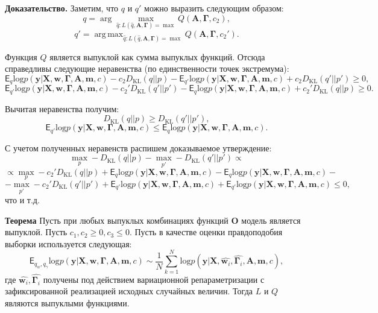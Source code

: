 \documentclass[12pt]{article}
\DeclareMathOperator*{\argmax}{arg\,max}
\begin{document}
\textbf{Доказательство.}
Заметим, что $q$ и $q'$ можно выразить следующим образом:
\[
    q = \arg\max_{\hat{q}: L(\hat{q}, \mathbf{A}, \boldsymbol{\Gamma}) = \max} Q( \mathbf{A}, \boldsymbol{\Gamma}, c_2),
\]
\[
    q' = \argmax_{\hat{q}: L(\hat{q}, \mathbf{A}, \boldsymbol{\Gamma})  = \max} Q( \mathbf{A}, \boldsymbol{\Gamma}, c_2').
\]

Функция $Q$ является выпуклой как сумма выпуклых функций. Отсюда справедливы следующие неравенства (по единственности точек экстремума):
\[
    \mathsf{E}_{q}\text{log} p(\mathbf{y}|\mathbf{X},\mathbf{w}, \boldsymbol{\Gamma}, \mathbf{A},\mathbf{m}, c) - c_2  D_\text{KL}(q||p)  -  \mathsf{E}_{q'}\text{log} p(\mathbf{y}|\mathbf{X},\mathbf{w}, \boldsymbol{\Gamma}, \mathbf{A},\mathbf{m}, c) + c_2  D_\text{KL}(q'||p') \geq 0,
\]
\[
    \mathsf{E}_{q'}\text{log} p(\mathbf{y}|\mathbf{X},\mathbf{w}, \boldsymbol{\Gamma}, \mathbf{A},\mathbf{m}, c) - c_2'  D_\text{KL}(q'||p')  -  \mathsf{E}_{q}\text{log} p(\mathbf{y}|\mathbf{X},\mathbf{w}, \boldsymbol{\Gamma}, \mathbf{A},\mathbf{m}, c) + c_2'  D_\text{KL}(q||p) \geq 0.
\]

Вычитая неравенства получим:
\[
    D_\text{KL}(q||p) \geq D_\text{KL}(q'||p'),
\]
\[
    \mathsf{E}_{q'}\text{log} p(\mathbf{y}|\mathbf{X},\mathbf{w}, \boldsymbol{\Gamma}, \mathbf{A},\mathbf{m}, c)  \leq \mathsf{E}_{q}\text{log} p(\mathbf{y}|\mathbf{X},\mathbf{w}, \boldsymbol{\Gamma}, \mathbf{A},\mathbf{m}, c) .
\]

С учетом полученных неравенств распишем доказываемое утверждение:
\[
    \max_p -D_\text{KL}(q||p) - \max_{p'} -D_\text{KL}(q'||p') \propto 
\]
\[ \propto\max_p - c_2' D_\text{KL}(q||p) +\mathsf{E}_{q}\text{log} p(\mathbf{y}|\mathbf{X},\mathbf{w}, \boldsymbol{\Gamma}, \mathbf{A},\mathbf{m}, c) - \mathsf{E}_{q}\text{log} p(\mathbf{y}|\mathbf{X},\mathbf{w}, \boldsymbol{\Gamma}, \mathbf{A},\mathbf{m}, c) -
\]
\[  - \max_{p'} -c_2' D_\text{KL}(q'||p')  + \mathsf{E}_{q'}\text{log} p(\mathbf{y}|\mathbf{X},\mathbf{w}, \boldsymbol{\Gamma}, \mathbf{A},\mathbf{m}, c) +\mathsf{E}_{q'}\text{log} p(\mathbf{y}|\mathbf{X},\mathbf{w}, \boldsymbol{\Gamma}, \mathbf{A},\mathbf{m}, c)     \leq 0,  
\]
что и т.д.

\textbf{Теорема} Пусть при любых выпуклых комбинациях функций $\mathbf{O}$ модель является выпуклой. Пусть $c_1,c_2 \geq 0,  c_3 \leq 0$. Пусть в качестве оценки правдоподобия выборки используется следующая:
\[
    \mathsf{E}_{q_w,q_\gamma}\text{log} p(\mathbf{y}|\mathbf{X},\mathbf{w}, \boldsymbol{\Gamma}, \mathbf{A},\mathbf{m}, c) \sim \frac{1}{N}\sum_{k=1}^N \text{log} p(\mathbf{y}|\mathbf{X},\hat{\mathbf{w}_i}, \hat{\boldsymbol{\Gamma}_i}, \mathbf{A},\mathbf{m}, c),
\]  
где $\hat{\mathbf{w}_i}, \hat{\boldsymbol{\Gamma}_i}$ получены под действием вариационной репараметризации с зафиксированной реализацией исходных случайных величин. Тогда $L$ и $Q$ являются выпуклыми функциями.
\end{document}
